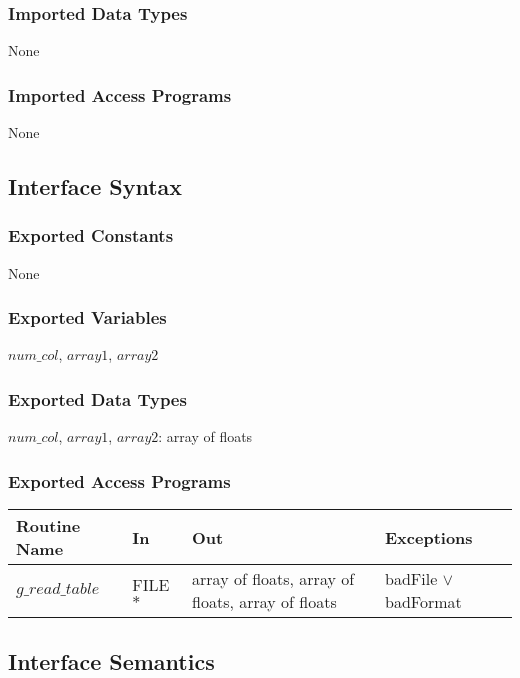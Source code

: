 \documentclass[12pt]{article}
\begin{document}
\subsubsection{Imported Data Types}

None

\subsubsection{Imported Access Programs}

None

\subsection{Interface Syntax}

\subsubsection{Exported Constants}

None

\subsubsection{Exported Variables}

$num\_col$, $array1$, $array2$

\subsubsection{Exported Data Types}

$num\_col$, $array1$, $array2$: array of floats

\subsubsection{Exported Access Programs}

\begin{center}
\begin{tabular}{l l p{2.6cm} l}\hline 
\textbf{Routine Name} & \textbf{In} &\textbf{Out} & \textbf{Exceptions} \\ \hline 
$g\_read\_table$ & FILE $\ast$ & array of floats, array of floats, array of floats & badFile $\vee$ badFormat\\ \hline
\end{tabular}
\end{center}

\subsection{Interface Semantics}
\end{document}
